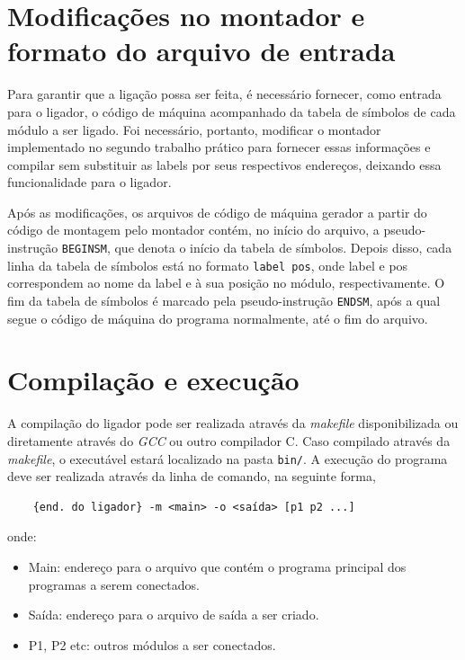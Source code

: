 \documentclass[12pt,a4paper]{article}
\numberwithin{equation}{section}
\begin{document}
\section{Modificações no montador e formato do arquivo de entrada}

Para garantir que a ligação possa ser feita, é necessário fornecer, como entrada para o ligador, o código de máquina acompanhado da tabela de símbolos de cada módulo a ser ligado. Foi necessário, portanto, modificar o montador implementado no segundo trabalho prático para fornecer essas informações e compilar sem substituir as labels por seus respectivos endereços, deixando essa funcionalidade para o ligador.

Após as modificações, os arquivos de código de máquina gerador a partir do código de montagem pelo montador contém, no início do arquivo, a pseudo-instrução \verb|BEGINSM|, que denota o início da tabela de símbolos. Depois disso, cada linha da tabela de símbolos está no formato \verb|label pos|, onde label e pos correspondem ao nome da label e à sua posição no módulo, respectivamente. O fim da tabela de símbolos é marcado pela pseudo-instrução \verb|ENDSM|, após a qual segue o código de máquina do programa normalmente, até o fim do arquivo.

\section{Compilação e execução}

A compilação do ligador pode ser realizada através da \emph{makefile} disponibilizada ou diretamente através do \emph{GCC} ou outro compilador C. Caso compilado através da \emph{makefile}, o executável estará localizado na pasta \verb|bin/|. A execução do programa deve ser realizada através da linha de comando, na seguinte forma,

\begin{verbatim}
    {end. do ligador} -m <main> -o <saída> [p1 p2 ...]
\end{verbatim}

onde:

\begin{itemize}
    \item Main: endereço para o arquivo que contém o programa principal dos programas a serem conectados.
    \item Saída: endereço para o arquivo de saída a ser criado.
    \item P1, P2 etc: outros módulos a ser conectados.
\end{itemize}
\end{document}
